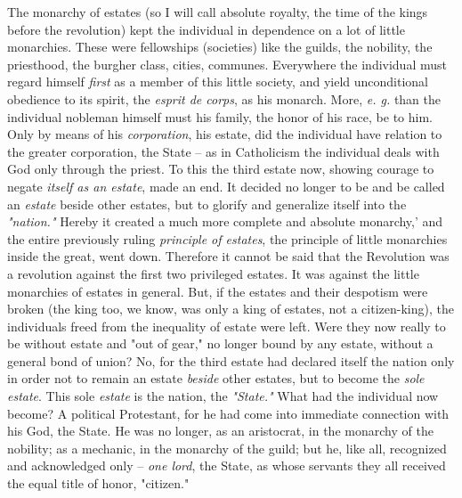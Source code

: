 \documentclass[a4paper]{book}
\begin{document}
The monarchy of estates (so I will call absolute royalty, the time of the 
kings before the revolution) kept the individual in dependence on a lot of 
little monarchies. These were fellowships (societies) like the guilds, the 
nobility, the priesthood, the burgher class, cities, communes. Everywhere the 
individual must regard himself \textit{first} as a member of this little 
society, and yield unconditional obedience to its spirit, the \textit{esprit 
de corps}, as his monarch. More, \textit{e. g.} than the individual nobleman 
himself must his family, the honor of his race, be to him. Only by means of 
his \textit{corporation}, his estate, did the individual have relation to the 
greater corporation, the State -- as in Catholicism the individual deals with 
God only through the priest. To this the third estate now, showing courage to 
negate \textit{itself as an estate}, made an end. It decided no longer to be 
and be called an \textit{estate} beside other estates, but to glorify and 
generalize itself into the \textit{"{}nation."{}} Hereby it created a much 
more complete and absolute monarchy,' and the entire previously ruling 
\textit{principle of estates}, the principle of little monarchies inside the 
great, went down. Therefore it cannot be said that the Revolution was a 
revolution against the first two privileged estates. It was against the little 
monarchies of estates in general. But, if the estates and their despotism were 
broken (the king too, we know, was only a king of estates, not a 
citizen-king), the individuals freed from the inequality of estate were left. 
Were they now really to be without estate and "{}out of gear,"{} no longer 
bound by any estate, without a general bond of union? No, for the third estate 
had declared itself the nation only in order not to remain an estate 
\textit{beside} other estates, but to become the \textit{sole estate}. This 
sole \textit{estate} is the nation, the \textit{"{}State."{}} What had the 
individual now become? A political Protestant, for he had come into immediate 
connection with his God, the State. He was no longer, as an aristocrat, in the 
monarchy of the nobility; as a mechanic, in the monarchy of the guild; but he, 
like all, recognized and acknowledged only -- \textit{one lord}, the State, as 
whose servants they all received the equal title of honor, "{}citizen."{}
\end{document}
